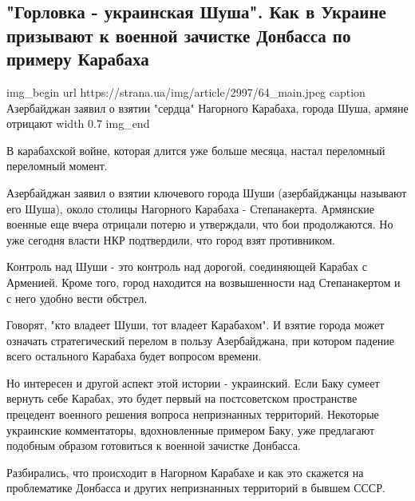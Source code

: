  
 
 

\subsection{"Горловка - украинская Шуша". Как в Украине призывают к военной зачистке Донбасса по примеру Карабаха}
\label{sec:09_11_2020.news.ua.strana.2.karabah_shusha}


\ifcmt
img_begin 
	url https://strana.ua/img/article/2997/64_main.jpeg
	caption Азербайджан заявил о взятии "сердца" Нагорного Карабаха, города Шуша, армяне отрицают 
	width 0.7
img_end
\fi

В карабахской войне, которая длится уже больше месяца, настал переломный
переломный момент.

Азербайджан заявил о взятии ключевого города Шуши (азербайджанцы называют его
Шуша), около столицы Нагорного Карабаха - Степанакерта. Армянские военные еще
вчера отрицали потерю и утверждали, что бои продолжаются. Но уже сегодня власти
НКР подтвердили, что город взят противником. 

Контроль над Шуши - это контроль над дорогой, соединяющей Карабах с Арменией.
Кроме того, город находится на возвышенности над Степанакертом и с него удобно
вести обстрел.

Говорят, "кто владеет Шуши, тот владеет Карабахом". И взятие города может
означать стратегический перелом в пользу Азербайджана, при котором падение
всего остального Карабаха будет вопросом времени.

Но интересен и другой аспект этой истории - украинский. Если Баку сумеет
вернуть себе Карабах, это будет первый на постсоветском пространстве прецедент
военного решения вопроса непризнанных территорий. Некоторые украинские
комментаторы, вдохновленные примером Баку, уже предлагают подобным образом
готовиться к военной зачистке Донбасса. 

Разбирались, что происходит в Нагорном Карабахе и как это скажется на
проблематике Донбасса и других непризнанных территорий в бывшем СССР. 

